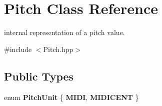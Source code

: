 \hypertarget{classPitch}{}\section{Pitch Class Reference}
\label{classPitch}


internal representation of a pitch value.  




{\ttfamily \#include $<$Pitch.\+hpp$>$}

\subsection*{Public Types}
\begin{DoxyCompactItemize}
\item 
\mbox{\label{classPitch_ae72a31f8d047b4b6fa468714f7588a4b}} 
enum {\bfseries Pitch\+Unit} \{ {\bfseries M\+I\+DI}, 
{\bfseries M\+I\+D\+I\+C\+E\+NT}
 \}
\end{DoxyCompactItemize}
